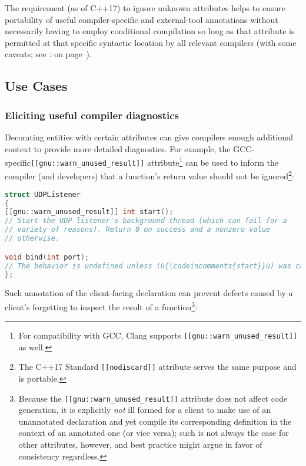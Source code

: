 The requirement (as of C++17) to ignore unknown attributes helps to
ensure portability of useful compiler-specific and external-tool
annotations without necessarily having to employ conditional compilation
so long as that attribute is permitted at that specific syntactic
location by all relevant compilers (with some caveats;
see {\it{}:} {\it{}} on page~\pageref{not-every-syntactic-location-is-viable-for-an-attribute}).

\subsection[Use Cases]{Use Cases}\label{attribute-use-cases}

\subsubsection[Eliciting useful compiler diagnostics]{Eliciting useful compiler diagnostics}\label{eliciting-useful-compiler-diagnostics}

Decorating entities with certain attributes can give compilers enough
additional context to provide more detailed diagnostics. For example,
the GCC-specific\linebreak[4] \texttt{[[gnu::warn\_unused\_result]]}
attribute{\cprotect\footnote{For compatibility with GCC,
Clang supports \texttt{[[gnu::warn\_unused\_result]]} as
well.}} can be used to inform the compiler (and developers) that a
function's return value should not be ignored{\cprotect\footnote{The
C++17 Standard \texttt{[[nodiscard]]} attribute serves the same
purpose and is portable.}}:

\begin{lstlisting}[language=C++]
struct UDPListener
{
[[gnu::warn_unused_result]] int start();
// Start the UDP listener's background thread (which can fail for a
// variety of reasons). Return 0 on success and a nonzero value
// otherwise.

void bind(int port);
// The behavior is undefined unless (ù{\codeincomments{start}}ù) was called successfully.
};
\end{lstlisting}

\noindent Such annotation of the client-facing declaration can prevent defects
caused by a client's forgetting to inspect the result of a
function{\cprotect\footnote{Because the
\texttt{[[gnu::warn\_unused\_result]]} attribute does not affect code
generation, it is explicitly \emph{not} ill formed for a client to
make use of an unannotated declaration and yet compile its
corresponding definition in the context of an annotated one (or vice
versa); such is not always the case for other attributes, however, and
best practice might argue in favor of consistency regardless.}}:


